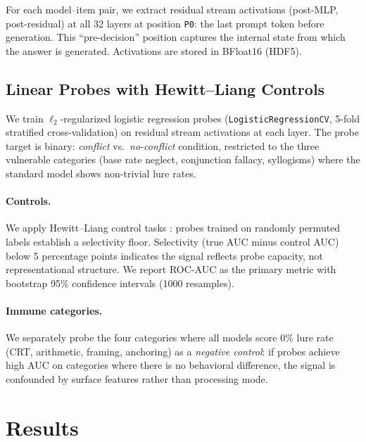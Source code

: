 \documentclass[twocolumn,10pt]{article}
\newcommand{\pzero}{\texttt{P0}}
\begin{document}
For each model--item pair, we extract residual stream activations
(post-MLP, post-residual) at all 32 layers at position \pzero{}: the
last prompt token before generation.  This ``pre-decision'' position
captures the internal state from which the answer is generated.
Activations are stored in BFloat16 (HDF5).

\subsection{Linear Probes with Hewitt--Liang Controls}
\label{sec:probes}

We train $\ell_2$-regularized logistic regression probes
(\texttt{LogisticRegressionCV}, 5-fold stratified cross-validation) on
residual stream activations at each layer.  The probe target is binary:
\emph{conflict} vs.\ \emph{no-conflict} condition, restricted to the three
vulnerable categories (base rate neglect, conjunction fallacy, syllogisms)
where the standard model shows non-trivial lure rates.

\paragraph{Controls.}  We apply Hewitt--Liang control tasks
\citep{hewitt2019control}: probes trained on randomly permuted labels
establish a selectivity floor.  Selectivity (true AUC minus control AUC)
below 5 percentage points indicates the signal reflects probe capacity,
not representational structure.  We report ROC-AUC as the primary metric
with bootstrap 95\% confidence intervals (1000 resamples).

\paragraph{Immune categories.}  We separately probe the four categories
where all models score 0\% lure rate (CRT, arithmetic, framing,
anchoring) as a \emph{negative control}: if probes achieve high AUC on
categories where there is no behavioral difference, the signal is
confounded by surface features rather than processing mode.


\section{Results}
\label{sec:results}
\end{document}
